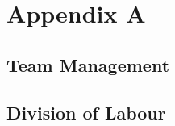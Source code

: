 \clearpage
\section{Appendix A}

\subsection{Team Management}

\clearpage
\subsection{Division of Labour}